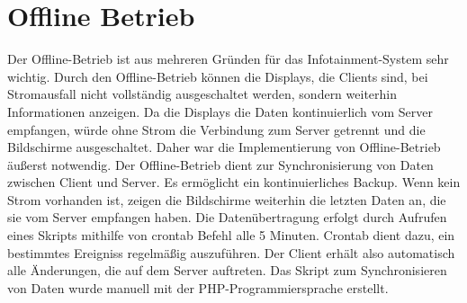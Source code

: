 \section{Offline Betrieb}
Der Offline-Betrieb ist aus mehreren Gründen für das Infotainment-System sehr wichtig. Durch den Offline-Betrieb können die Displays, die Clients sind, bei Stromausfall nicht vollständig ausgeschaltet werden, sondern weiterhin Informationen anzeigen. Da die Displays die Daten kontinuierlich vom Server empfangen, würde ohne Strom die Verbindung zum Server getrennt und die Bildschirme ausgeschaltet. Daher war die Implementierung von Offline-Betrieb äußerst notwendig. Der Offline-Betrieb dient zur Synchronisierung von Daten zwischen Client und Server. Es ermöglicht ein kontinuierliches Backup. Wenn kein Strom vorhanden ist, zeigen die Bildschirme weiterhin die letzten Daten an, die sie vom Server empfangen haben. Die Datenübertragung erfolgt durch Aufrufen eines Skripts mithilfe von crontab Befehl alle 5 Minuten. Crontab dient dazu, ein bestimmtes Ereigniss regelm\"a\ss{}ig auszuf\"uhren. Der Client erhält also automatisch alle Änderungen, die auf dem Server auftreten. Das Skript zum Synchronisieren von Daten wurde manuell mit der PHP-Programmiersprache erstellt.
